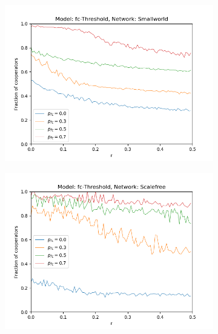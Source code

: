 \documentclass[11pt, A4 paper, twocolumn ]{article}
\begin{document}
\begin{figure}[p]
\begin{subfigure}[b]{0.3\textwidth}
		\includegraphics[width=\textwidth]{graphs/varying-pfc-swb2}
		\caption{}
		\label{fig:sw-fct}
	\end{subfigure}
	\begin{subfigure}[b]{0.3\textwidth}
		\centering
		\includegraphics[width=\textwidth]{graphs/varying-pfc-sfb2}
		\caption{}
		\label{fig:sf-fct}
	\end{subfigure}
\begin{subfigure}[b]{0.3\textwidth}
	\centering

\end{subfigure}
\end{figure}
\end{document}
